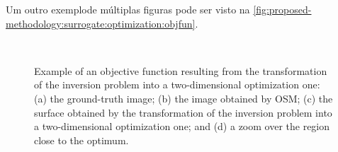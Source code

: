 		Um outro exemplode múltiplas figuras pode ser visto na \autoref{fig:proposed-methodology:surrogate:optimization:objfun}.
		\begin{figure}[!h]
			\centering
			 \hspace{.05\textwidth}
			 \\
			 \hspace{.05\textwidth}
			\caption[Example of an objective function resulting from the transformation of the inversion problem into a two-dimensional optimization one.]{Example of an objective function resulting from the transformation of the inversion problem into a two-dimensional optimization one: (a) the ground-truth image; (b) the image obtained by OSM; (c) the surface obtained by the transformation of the inversion problem into a two-dimensional optimization one; and (d) a zoom over the region close to the optimum.}
			\label{fig:proposed-methodology:surrogate:optimization:objfun}
		\end{figure}
	
